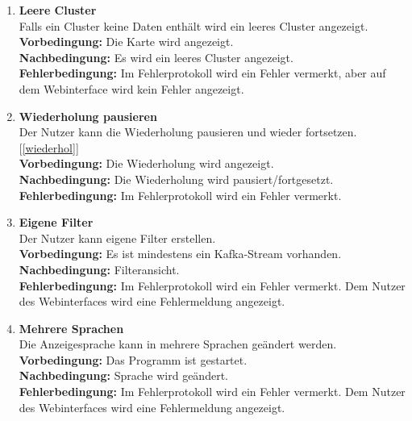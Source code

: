 \begin{enumerate}[label=\textbf{WF\arabic{enumi}0}]
	\item \textbf{Leere Cluster}\\
		Falls ein Cluster keine Daten enthält wird ein leeres Cluster angezeigt.\\
		\textbf{Vorbedingung:} Die Karte wird angezeigt.\\
		\textbf{Nachbedingung:} Es wird ein leeres Cluster angezeigt.\\
		\textbf{Fehlerbedingung:} Im Fehlerprotokoll wird ein Fehler vermerkt, aber auf dem Webinterface wird kein Fehler angezeigt.
		
	\item \textbf{Wiederholung pausieren}\\
		Der Nutzer kann die Wiederholung pausieren und wieder fortsetzen. [\ref{wiederhol}]\\
		\textbf{Vorbedingung:} Die Wiederholung wird angezeigt.\\
		\textbf{Nachbedingung:} Die Wiederholung wird pausiert/fortgesetzt.\\
		\textbf{Fehlerbedingung:} Im Fehlerprotokoll wird ein Fehler vermerkt.
	
	\item \textbf{Eigene Filter}\\
		Der Nutzer kann eigene Filter erstellen.\\
		\textbf{Vorbedingung:} Es ist mindestens ein Kafka-Stream vorhanden.\\
		\textbf{Nachbedingung:} Filteransicht.\\
		\textbf{Fehlerbedingung:} Im Fehlerprotokoll wird ein Fehler vermerkt. Dem Nutzer des Webinterfaces wird eine Fehlermeldung angezeigt.
		
	\item \textbf{Mehrere Sprachen}\\
		Die Anzeigesprache kann in mehrere Sprachen geändert werden.\\
		\textbf{Vorbedingung:} Das Programm ist gestartet.\\
		\textbf{Nachbedingung:} Sprache wird geändert.\\
		\textbf{Fehlerbedingung:} Im Fehlerprotokoll wird ein Fehler vermerkt. Dem Nutzer des Webinterfaces wird eine 		Fehlermeldung angezeigt.

\end{enumerate}
